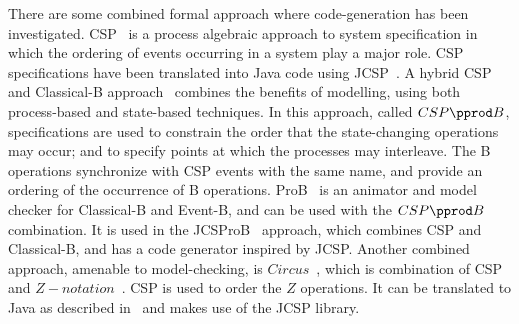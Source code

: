 There are some combined formal approach where code-generation has been investigated. CSP~\cite{HO85CSP,Roscoe1997} is a process algebraic approach to system specification in which the ordering of events occurring in a system play a major role. CSP specifications have been translated into Java code using JCSP~\cite{JCSPMulti, JCSPNet}. A hybrid CSP and Classical-B approach~\cite{SchneiderT02, SchneiderT05} combines the benefits of modelling, using both process-based and state-based techniques.  In this approach, called $CSP\pprod B$, specifications are used to constrain the order that the state-changing operations may occur; and to specify points at which the processes may interleave. The B operations synchronize with CSP events with the same name, and provide an ordering of the occurrence of B operations. ProB~\cite{LeuschelB08} is an animator and model checker for Classical-B and Event-B, and can be used with the $CSP\pprod B$ combination. It is used in the JCSProB~\cite{YangPop2007} approach, which combines CSP and Classical-B, and has a code generator inspired by JCSP. Another combined approach, amenable to model-checking, is $Circus$~\cite{WoodcockC01}, which is combination of CSP and $Z-notation$~\cite{Spivey89}. CSP is used to order the $Z$ operations. It can be translated to Java as described in~\cite{FreitasC06} and makes use of the JCSP library.

